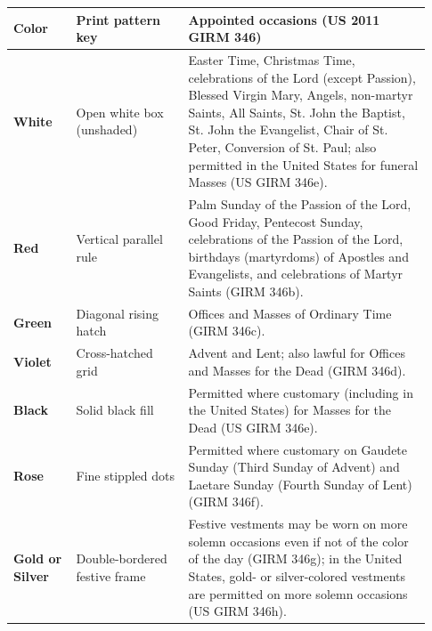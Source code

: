 {\footnotesize\begin{longtable}{>{\raggedright\arraybackslash}p{0.14\linewidth}>{\raggedright\arraybackslash}p{0.25\linewidth}>{\raggedright\arraybackslash}p{0.54\linewidth}}
\toprule
\textbf{Color} & \textbf{Print pattern key} & \textbf{Appointed occasions (US 2011 GIRM 346)} \\
\midrule
\endhead
\textbf{White} & Open white box (unshaded) & Easter Time, Christmas Time, celebrations of the Lord (except Passion), Blessed Virgin Mary, Angels, non-martyr Saints, All Saints, St. John the Baptist, St. John the Evangelist, Chair of St. Peter, Conversion of St. Paul; also permitted in the United States for funeral Masses (US GIRM 346e). \\
\textbf{Red} & Vertical parallel rule & Palm Sunday of the Passion of the Lord, Good Friday, Pentecost Sunday, celebrations of the Passion of the Lord, birthdays (martyrdoms) of Apostles and Evangelists, and celebrations of Martyr Saints (GIRM 346b). \\
\textbf{Green} & Diagonal rising hatch & Offices and Masses of Ordinary Time (GIRM 346c). \\
\textbf{Violet} & Cross-hatched grid & Advent and Lent; also lawful for Offices and Masses for the Dead (GIRM 346d). \\
\textbf{Black} & Solid black fill & Permitted where customary (including in the United States) for Masses for the Dead (US GIRM 346e). \\
\textbf{Rose} & Fine stippled dots & Permitted where customary on Gaudete Sunday (Third Sunday of Advent) and Laetare Sunday (Fourth Sunday of Lent) (GIRM 346f). \\
\textbf{Gold or Silver} & Double-bordered festive frame & Festive vestments may be worn on more solemn occasions even if not of the color of the day (GIRM 346g); in the United States, gold- or silver-colored vestments are permitted on more solemn occasions (US GIRM 346h). \\
\bottomrule
\end{longtable}}
\fi
